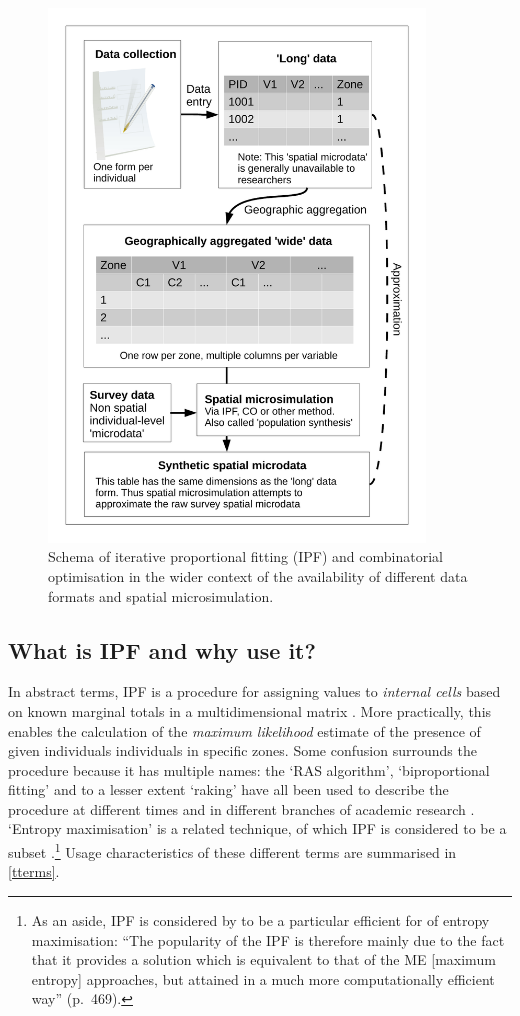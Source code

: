 \documentclass[a4paper,10pt]{article}
\begin{document}
\begin{figure}
\begin{center}
  \includegraphics[width=10cm]{msim-schema}
\end{center}

\caption{Schema of iterative proportional fitting (IPF) and combinatorial optimisation
in the wider context of the availability of different data formats and spatial microsimulation. \label{fmsim-schema}}
\end{figure}

\subsection{What is IPF and why use it?} 
\label{swhatis}

In abstract terms, IPF is a procedure for assigning values to \emph{internal cells}
based on known marginal totals in a multidimensional matrix \citep{Cleave1995}.
More practically, this enables the calculation of the
\emph{maximum likelihood} estimate of the presence of
given individuals individuals in specific zones.
Some confusion surrounds the procedure because it has multiple names:
the `RAS algorithm', `biproportional fitting' and to a lesser extent
`raking' have all been used to describe the procedure
at different times and in different branches of academic research \citep{Lahr2004}.
`Entropy maximisation' is a related technique, of which IPF is considered to be a
subset \citep{Johnston1993,Rich2012}.\footnote{As an
aside, IPF is considered by \citet{Rich2012} to be a particular
efficient for of entropy maximisation: ``The popularity of the IPF is therefore mainly due to the fact that it provides a
solution which is equivalent to that of the ME [maximum entropy]
approaches, but attained in a much more
computationally efficient way'' (p.~469).
}
Usage characteristics of these different terms are summarised in \cref{tterms}.
\end{document}
